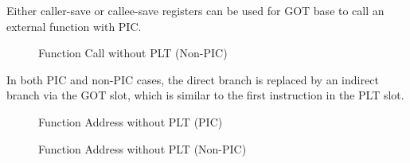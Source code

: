 \noindent
Either caller-save or callee-save registers can be used for GOT base
to call an external function with PIC.

\begin{figure}[H]
\Hrule
\caption{Function Call without PLT (Non-PIC)}
\begin{center}
\small{}
\end{center}
\Hrule
\end{figure}

In both PIC and non-PIC cases, the direct branch is replaced by an
indirect branch via the GOT slot, which is similar to the first
instruction in the PLT slot.

\begin{figure}[H]
\Hrule
\caption{Function Address without PLT (PIC)}
\begin{center}
\small{}
\end{center}
\Hrule
\end{figure}

\begin{figure}[H]
\Hrule
\caption{Function Address without PLT (Non-PIC)}
\begin{center}
\small{}
\end{center}
\Hrule
\end{figure}

